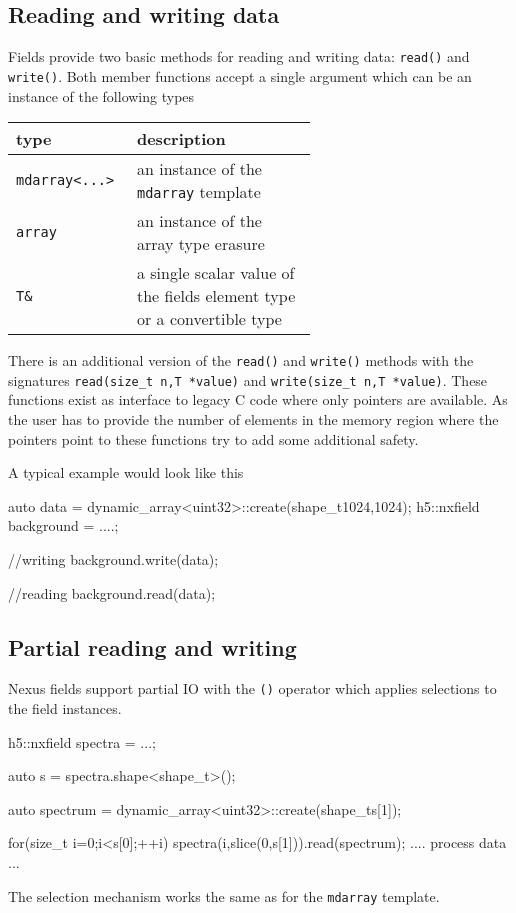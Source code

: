 \subsection{Reading and writing data}

Fields provide two basic methods for reading and writing data: {\tt read()} and 
{\tt write()}. 
Both member functions accept a single argument which can be an instance of the
following types
\begin{center}
    \begin{tabular}{l|p{0.6\linewidth}}
        {\bf type} & {\bf description} \\
        \hline
        \hline
        {\tt mdarray<...>} & an instance of the {\tt mdarray} template \\
        \hline
        {\tt array} & an instance of the array type erasure \\
        \hline
        {\tt T\& } & a single scalar value of the fields element type or a 
        convertible type \\
        \hline
    \end{tabular}
\end{center}
There is an additional version of the {\tt read()} and {\tt write()} methods
with the signatures {\tt read(size\_t n,T *value)}
and {\tt write(size\_t n,T *value)}. These functions exist as interface to
legacy C code where only pointers are available. As the user has to provide the
number of elements in the memory region where the pointers point to these
functions try to add some additional safety.

A typical example would look like this
\begin{cppcode}
auto data = dynamic_array<uint32>::create(shape_t{1024,1024});
h5::nxfield background = ....;

//writing
background.write(data);

//reading
background.read(data);
\end{cppcode}

\subsection{Partial reading and writing}

Nexus fields support partial IO with the {\tt ()} operator which applies
selections to the field instances. 
\begin{cppcode}
h5::nxfield spectra = ...;

auto s = spectra.shape<shape_t>();

auto spectrum = dynamic_array<uint32>::create(shape_t{s[1]});

for(size_t i=0;i<s[0];++i)
{
    spectra(i,slice(0,s[1])).read(spectrum);
    .... process data ...
}
\end{cppcode}
The selection mechanism works the same as for the {\tt mdarray} template. 

